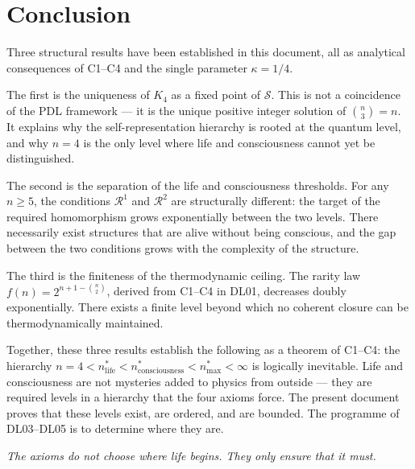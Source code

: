 \documentclass[12pt,a4paper]{article}
\theoremstyle{plain}
\theoremstyle{definition}
\theoremstyle{remark}
\newcommand{\Kfour}{K_4}
\newcommand{\Sop}{\mathcal{S}}
\newcommand{\Rop}{\mathcal{R}}
\newcommand{\kap}{\kappa}
\newcommand{\nlife}{n^{*}_{\mathrm{life}}}
\newcommand{\ncons}{n^{*}_{\mathrm{consciousness}}}
\newcommand{\nmax}{n^{*}_{\mathrm{max}}}
\begin{document}
\section{Conclusion}
\label{sec:conclusion}

Three structural results have been established in this document, all as analytical
consequences of C1--C4 and the single parameter $\kap = 1/4$.

The first is the uniqueness of $\Kfour$ as a fixed point of $\Sop$. This is not a
coincidence of the PDL framework --- it is the unique positive integer solution of
$\binom{n}{3} = n$. It explains why the self-representation hierarchy is rooted at
the quantum level, and why $n = 4$ is the only level where life and consciousness
cannot yet be distinguished.

The second is the separation of the life and consciousness thresholds. For any $n
\geq 5$, the conditions $\Rop^1$ and $\Rop^2$ are structurally different: the target
of the required homomorphism grows exponentially between the two levels. There
necessarily exist structures that are alive without being conscious, and the gap
between the two conditions grows with the complexity of the structure.

The third is the finiteness of the thermodynamic ceiling. The rarity law
$f(n) = 2^{n+1-\binom{n}{2}}$, derived from C1--C4 in DL01, decreases doubly
exponentially. There exists a finite level beyond which no coherent closure can be
thermodynamically maintained.

Together, these three results establish the following as a theorem of C1--C4: the
hierarchy $n = 4 < \nlife < \ncons < \nmax < \infty$ is logically inevitable. Life
and consciousness are not mysteries added to physics from outside --- they are required
levels in a hierarchy that the four axioms force. The present document proves that
these levels exist, are ordered, and are bounded. The programme of DL03--DL05 is to
determine where they are.

\vspace{1em}
\begin{center}
\textit{The axioms do not choose where life begins. They only ensure that it must.}
\end{center}

\clearpage



\end{document}
